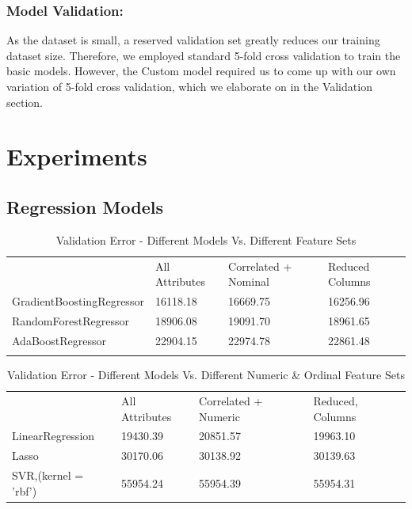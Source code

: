 \documentclass[conference,compsoc]{IEEEtran}
\begin{document}
\subsubsection{Model Validation:} 
\par
As the dataset is small, a reserved validation set greatly reduces our training dataset size. Therefore, we employed standard 5-fold cross validation to train the basic models. However, the Custom model required us to come up with our own variation of 5-fold cross validation, which we elaborate on in the Validation section.

\section{Experiments}
\subsection{Regression Models}

\begin{table}[!htbp]
\centering
\caption{Validation Error - Different Models Vs. Different Feature Sets}
\label{table:reg_models1}
\begin{tabular}{llll}
                          & All Attributes & Correlated + Nominal & Reduced Columns \\
GradientBoostingRegressor & 16118.18       & 16669.75           & 16256.96        \\
RandomForestRegressor     & 18906.08       & 19091.70           & 18961.65        \\
AdaBoostRegressor         & 22904.15       & 22974.78           & 22861.48        \\
                          &                &                    &                
\end{tabular}
\end{table}

\begin{table}[!htbp]
\centering
\caption{Validation Error - Different Models Vs. Different Numeric \& Ordinal Feature Sets}
\label{table:reg_models2}
\begin{tabular}{llll}
                      & All Attributes  & Correlated + Numeric  & Reduced, Columns \\
LinearRegression      & 19430.39        & 20851.57            & 19963.10 \\
Lasso                 & 30170.06        & 30138.92            & 30139.63 \\
SVR,(kernel = 'rbf')  & 55954.24        & 55954.39            & 55954.31 \\
\end{tabular}
\end{table}
\end{document}
